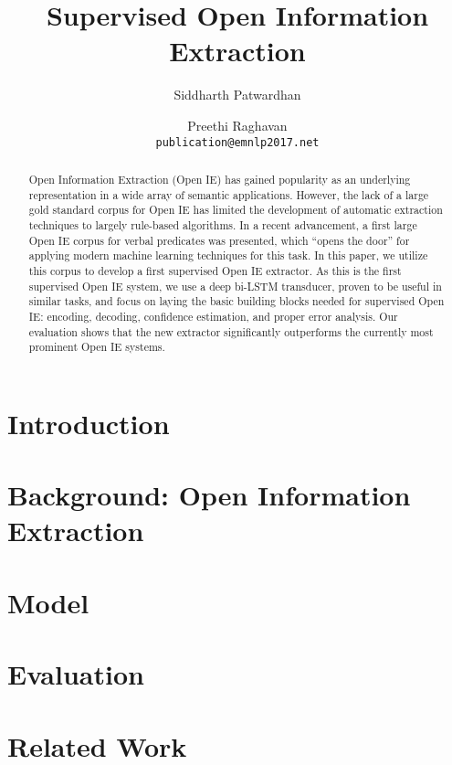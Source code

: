 \documentclass[11pt,letterpaper]{article}
\title{Supervised Open Information Extraction}
\author{Siddharth Patwardhan \and Preethi Raghavan \\
  {\tt publication@emnlp2017.net}}
\date{}
\begin{document}
\maketitle

\begin{abstract}
  Open Information Extraction (Open IE) has gained popularity as an underlying representation in a
  wide array of semantic applications.
  However, the lack of a large gold standard corpus for Open IE has
  limited the development of automatic extraction techniques to largely rule-based algorithms.
  In a recent advancement, a first large Open IE corpus for verbal predicates was presented, which ``opens the door'' for applying modern machine learning techniques for this task.
  In this paper, we utilize this corpus to develop a first supervised Open IE extractor.
  As this is the first supervised Open IE system,
  we use a deep bi-LSTM transducer, proven to be useful in similar tasks, and focus on laying the basic building blocks needed for supervised Open IE: encoding, decoding, confidence estimation, and proper error analysis.
  Our evaluation shows that the new extractor significantly outperforms
  the currently most prominent Open IE systems.
\end{abstract}

\section{Introduction}
\label{sec:introduction}



\section{Background: Open Information Extraction}
\label{sec:background}




\section{Model}
\label{sec:model}


\section{Evaluation}
\label{sec:evaluation}


\section{Related Work}
\label{sec:related}

\end{document}
